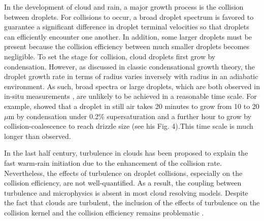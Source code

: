 In the development of cloud and rain, a major growth process is the collision between droplets. For collisions to occur, a broad droplet spectrum is favored to guarantee a significant difference in droplet terminal velocities so that droplets can efficiently encounter one another. In addition, some larger droplets must be present because the collision efficiency between much smaller droplets becomes negligible. To set the stage for collision, cloud droplets first grow by condensation. However, as discussed in classic condensational growth theory, the droplet growth rate in terms of radius varies inversely with radius in an adiabatic environment. As such, broad spectra or large droplets, which are both observed in in-situ measurements \citep[e.g.,][]{Khain2013}, are unlikely to be achieved in a reasonable time scale. For example, \citet{Jonas1996} showed that a droplet in still air takes 20 minutes to grow from 10 to 20 $\mu$m by condensation under 0.2\% supersaturation and a further hour to grow by collision-coalescence to reach drizzle size (see his Fig. 4).This time scale is much longer than observed. 

In the last half century, turbulence in clouds has been proposed to explain the fast warm-rain initiation due to the enhancement of the collision rate. Nevertheless, the effects of turbulence on droplet collisions, especially on the collision efficiency, are not well-quantified. As a result, the coupling between turbulence and microphysics is absent in most cloud resolving models. Despite the fact that clouds are turbulent, the inclusion of the effects of turbulence on the collision kernel and the collision efficiency remains problematic \citep{Grabowski2013}. 

